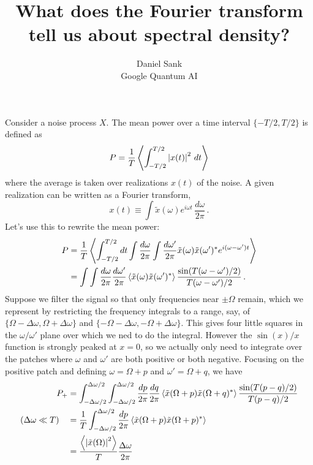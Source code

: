 \documentclass{article}
\title{What does the Fourier transform tell us about spectral density?}
\author{Daniel Sank \\ \small{Google Quantum AI}}
\begin{document}
\maketitle


Consider a noise process $X$.
The mean power over a time interval $\{-T/2,T/2\}$ is defined as
\begin{equation}
P = \frac{1}{T} \left \langle \int_{-T/2}^{T/2} \left \lvert x(t) \right \rvert^2 \, dt \right \rangle
\end{equation}
where the average is taken over realizations $x(t)$ of the noise.
A given realization can be written as a Fourier transform,
\begin{equation}
x(t) \equiv
\int \tilde{x}(\omega) e^{i \omega t} \, \frac{d \omega}{2\pi} \, .
\end{equation}
Let's use this to rewrite the mean power:
\begin{align}
P
&= \frac{1}{T}\left \langle 
\int_{-T/2}^{T/2} dt
\int \frac{d\omega}{2\pi}
\int \frac{d\omega'}{2\pi}
\tilde{x}(\omega) \tilde{x}(\omega')^*
e^{i(\omega - \omega')t} \right \rangle \nonumber \\
&= \int \int \frac{d\omega}{2\pi} \frac{d\omega'}{2\pi}
\left \langle \tilde{x}(\omega)\tilde{x}(\omega')^* \right \rangle
\frac{\sin(T(\omega - \omega')/2)}{T (\omega - \omega')/2} \, .
\end{align}
Suppose we filter the signal so that only frequencies near $\pm \Omega$ remain, which we represent by restricting the frequency integrals to a range, say, of $\{\Omega-\Delta \omega, \Omega+\Delta \omega\}$ and $\{-\Omega - \Delta \omega, -\Omega + \Delta \omega\}$.
This gives four little squares in the $\omega/\omega'$ plane over which we ned to do the integral.
However the $\sin(x)/x$ function is strongly peaked at $x=0$, so we actually only need to integrate over the patches where $\omega$ and $\omega'$ are both positive or both negative.
Focusing on the positive patch and defining $\omega = \Omega + p$ and $\omega' = \Omega + q$, we have
\begin{align}
P_+ &=
  \int_{-\Delta \omega/2}^{\Delta\omega/2}
  \int_{-\Delta \omega/2}^{\Delta\omega/2}
  \frac{dp}{2\pi} \frac{dq}{2\pi}
  \left \langle \tilde{x}(\Omega+p)\tilde{x}(\Omega+q)^* \right \rangle \frac{\sin(T(p-q)/2)}{T(p-q)/2} \nonumber \\
  (\Delta \omega \ll T) \quad &=
  \frac{1}{T} \int_{-\Delta \omega/2}^{\Delta \omega / 2}
  \frac{dp}{2\pi} \left \langle \tilde{x}(\Omega + p) \tilde{x}(\Omega + p)^* \right \rangle \nonumber \\
  &= \frac{\left \langle \left \lvert \tilde{x}(\Omega) \right \rvert^2 \right \rangle}{T} \frac{\Delta \omega}{2 \pi}
\end{align}
\end{document}
